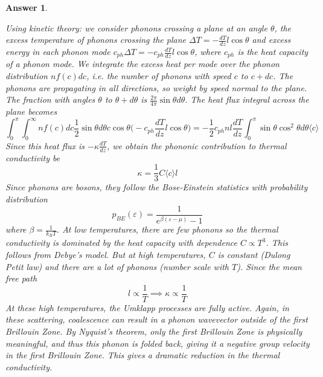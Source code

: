 \documentclass[a4paper]{article}
\newtheorem{ans}{Answer}[subsection]
\theoremstyle{new}
\begin{document}
\begin{ans}
\begin{itemize}
\end{itemize}
Using kinetic theory: we consider phonons crossing a plane at an angle $\theta$, the excess temperature of phonons crossing the plane $\Delta T=-\frac{dT}{dz}l\cos\theta$ and excess energy in each phonon mode $c_{ph}\Delta T=-c_{ph}\frac{dT}{dz}l\cos\theta$, where $c_{ph}$ is the heat capacity of a phonon mode. We integrate the excess heat per mode over the phonon distribution $nf(c)dc$, i.e. the number of phonons with speed $c$ to $c+dc$. The phonons are propagating in all directions, so weight by speed normal to the plane. The fraction with angles $\theta$ to $\theta+d\theta$ is $\frac{2\pi}{4\pi}\sin\theta d\theta$. The heat flux integral across the plane becomes
$$\int_0^\pi\int_0^\infty nf(c)dc\frac{1}{2}\sin\theta d\theta c\cos\theta\bigg(-c_{ph}\frac{dT}{dz}l\cos\theta\bigg)=-\frac{1}{2}c_{ph}nl\frac{dT}{dz}\int_0^\pi\sin\theta\cos^2\theta d\theta\langle c\rangle$$
Since this heat flux is $-\kappa\frac{dT}{dz}$, we obtain the phononic contribution to thermal conductivity be
$$\kappa=\frac{1}{3}C\langle c\rangle l$$
Since phonons are bosons, they follow the Bose-Einstein statistics with probability distribution
$$p_{BE}(\varepsilon)=\frac{1}{e^{\beta(\varepsilon-\mu)}-1}$$
where $\beta=\frac{1}{k_BT}$. At low temperatures, there are few phonons so the thermal conductivity is dominated by the heat capacity with dependence $C\propto T^3$. This follows from Debye's model. But at high temperatures, $C$ is constant (Dulong Petit law) and there are a lot of phonons (number scale with $T$). Since the mean free path 
$$l\propto\frac{1}{T}\implies\kappa\propto\frac{1}{T}$$
At these high temperatures, the Umklapp processes are fully active. Again, in these scattering, coalescence can result in a phonon wavevector outside of the first Brillouin Zone. By Nyquist's theorem, only the first Brillouin Zone is physically meaningful, and thus this phonon is folded back, giving it a negative group velocity in the first Brillouin Zone. This gives a dramatic reduction in the thermal conductivity.

\end{ans}
\end{document}
